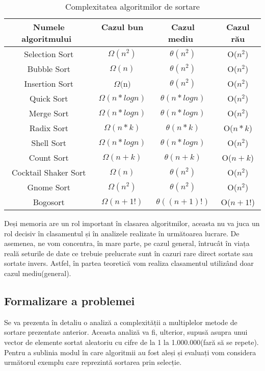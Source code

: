 \documentclass[12pt]{article}
\begin{document}
\begin{table}[ht]
\caption{Complexitatea algoritmilor de sortare}
\centering
\begin{tabular}{c c c c} 
\hline\hline 
Numele algoritmului\ &Cazul bun \ & Cazul mediu\ & Cazul rău \\ [0.5ex] 

\hline 
Selection Sort & $\Omega(n^2)$ & $\theta(n^2)$ & O($n^2$) \\ 
Bubble Sort & $\Omega(n)$ & $\theta(n^2)$ & O($n^2$) \\
Insertion Sort & $\Omega($n$)$ & $\theta(n^2)$ & O($n^2$) \\
Quick Sort & $\Omega(n*log n)$ & $\theta(n*log n)$ & O($n^2$) \\
Merge Sort & $\Omega(n*log n)$ & $\theta(n*log n)$ & O($n^2$) \\
Radix Sort & $\Omega(n*k)$ & $\theta(n*k)$ & O($n*k$) \\ 
Shell Sort & $\Omega(n*log n)$ & $\theta(n*log n)$ & O($n^2$)\\
Count Sort &  $\Omega(n+k)$ & $\theta(n+k)$ & O($n+k$)\\
Cocktail Shaker Sort&  $\Omega(n)$ & $\theta(n^2)$ & O($n^2$)\\
Gnome Sort &  $\Omega(n^2)$ & $\theta(n^2)$ & O($n^2$)\\
Bogosort &  $\Omega(n+1!)$ & $\theta((n+1)!)$ & O($n+1!$)\\[1ex]

\hline 
\end{tabular}
\label{table:nonlin} 
\end{table}

Deși memoria are un rol important în clasarea algoritmilor, aceasta nu va juca un rol decisiv în clasamentul și în analizele realizate în următoarea lucrare.
De asemenea, ne vom concentra, în mare parte, pe cazul general, întrucât în viața reală seturile de date ce trebuie prelucrate sunt în cazuri rare direct sortate sau sortate invers. Astfel, în partea teoretică vom realiza clasamentul utilizând doar cazul mediu(general).

\subsection{Formalizare a problemei}
\label{secece}
Se va prezenta în detaliu o analiză a complexității a multiplelor metode de sortare prezentate anterior.
Aceasta analiză va fi, ulterior, supusă asupra unui vector de elemente sortat aleatoriu cu cifre de la 1 la 1.000.000(fară să se repete).
Pentru a sublinia modul în care algoritmii au fost aleși și evaluați vom considera următorul exemplu care reprezintă sortarea prin selecție.
\end{document}
